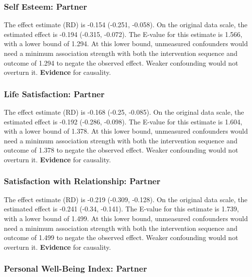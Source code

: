 \documentclass[
  singlecolumn]{article}
\begin{document}
\subsubsection{Self Esteem: Partner}\label{self-esteem-partner-17}

The effect estimate (RD) is -0.154 (-0.251, -0.058). On the original
data scale, the estimated effect is -0.194 (-0.315, -0.072). The E-value
for this estimate is 1.566, with a lower bound of 1.294. At this lower
bound, unmeasured confounders would need a minimum association strength
with both the intervention sequence and outcome of 1.294 to negate the
observed effect. Weaker confounding would not overturn it.
\textbf{Evidence} for causality.

\subsubsection{Life Satisfaction:
Partner}\label{life-satisfaction-partner-17}

The effect estimate (RD) is -0.168 (-0.25, -0.085). On the original data
scale, the estimated effect is -0.192 (-0.286, -0.098). The E-value for
this estimate is 1.604, with a lower bound of 1.378. At this lower
bound, unmeasured confounders would need a minimum association strength
with both the intervention sequence and outcome of 1.378 to negate the
observed effect. Weaker confounding would not overturn it.
\textbf{Evidence} for causality.

\subsubsection{Satisfaction with Relationship:
Partner}\label{satisfaction-with-relationship-partner-17}

The effect estimate (RD) is -0.219 (-0.309, -0.128). On the original
data scale, the estimated effect is -0.241 (-0.34, -0.141). The E-value
for this estimate is 1.739, with a lower bound of 1.499. At this lower
bound, unmeasured confounders would need a minimum association strength
with both the intervention sequence and outcome of 1.499 to negate the
observed effect. Weaker confounding would not overturn it.
\textbf{Evidence} for causality.

\subsubsection{Personal Well-Being Index:
Partner}\label{personal-well-being-index-partner-17}
\end{document}
